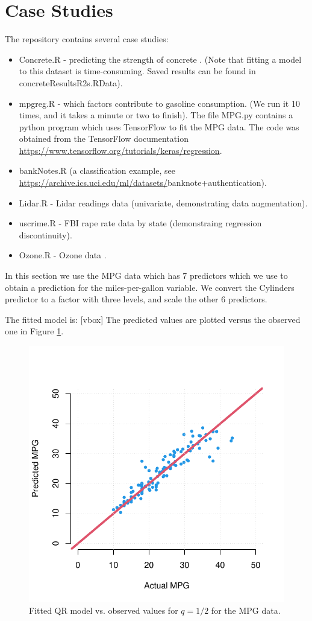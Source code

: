 \documentclass[a4paper,12pt]{article}
\begin{document}
\section{Case Studies}
The repository contains several case studies:
\begin{itemize}
 \item Concrete.R - predicting the strength of concrete \cite{YEH2006}. (Note that fitting a model to this dataset is time-consuming. Saved results can be found in concreteResultsR2s.RData).
 \item mpgreg.R - which factors contribute to gasoline consumption. (We run it 10 times, and it takes a minute or two to finish). The file MPG.py contains a python program which uses TensorFlow to fit the MPG data. The code was obtained from the TensorFlow documentation \url{https://www.tensorflow.org/tutorials/keras/regression}.
 \item bankNotes.R (a classification example, see \cite{Lohweg2006,Dua2019} \url{https://archive.ics.uci.edu/ml/datasets/}banknote+authentication).
 \item Lidar.R - Lidar readings data (univariate, demonstrating data augmentation).
 \item uscrime.R - FBI rape rate data by state (demonstraing regression discontinuity).
 \item Ozone.R - Ozone data \cite{lee:neld:pawi:2006}.
\end{itemize}

In this section we use the MPG data which has 7 predictors which we use to obtain a prediction for the miles-per-gallon variable. We convert the Cylinders predictor to a factor with three levels, and scale the other 6 predictors.

The fitted model is: [vbox]
\noindent The predicted values are plotted versus the observed one in Figure \ref{mpgplot}.

\begin{figure}[b!]
\centering
\includegraphics[width=.5\linewidth]{Figures/mpg.pdf}
\caption{Fitted QR model vs. observed values for $q=1/2$ for the MPG data.}\label{mpgplot}
\end{figure} 
\end{document}
